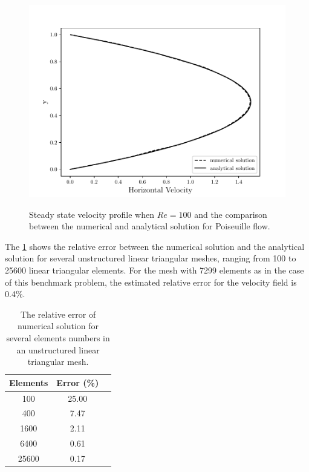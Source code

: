 \begin{figure}[H]
     \centering
     \includegraphics[scale=1]{./02_chaps/cap_validation/figure/poiseuille_velocity.pdf}\\
     \medskip
     \caption{
Steady state velocity profile when $Re=100$ and the comparison between
the numerical and analytical solution for Poiseuille flow.} 
     \label{velocidade poiseuille}
\end{figure}

\newpage
The \ref{erro relativo poiseuille tabela} shows the relative error 
between the numerical solution and the analytical solution 
for several unstructured linear triangular meshes, ranging 
from 100 to 25600 linear triangular elements. For the mesh 
with 7299 elements as in the case of this benchmark problem, 
the estimated relative error for the velocity field is 0.4\%.

\vspace{0.5cm}
\begin{table}[H]
\centering
\begin{tabular}{ccc}
\toprule
\textbf{Elements} & \textbf{Error} (\%) \\
\midrule
100 & 25.00 \\
400 & 7.47 \\
1600 & 2.11 \\
6400 & 0.61 \\
25600 & 0.17 \\
\bottomrule
\end{tabular}
\caption{The relative error of numerical solution for several elements numbers in an unstructured linear triangular mesh.}
\label{erro relativo poiseuille tabela}
\end{table}

